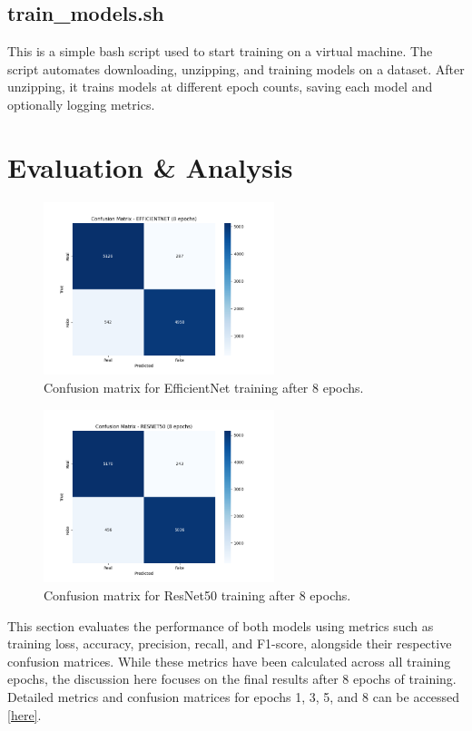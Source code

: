 \documentclass[conference]{IEEEtran}
\begin{document}
    \subsection*{train\_models.sh}
    This is a simple bash script used to start training on a virtual machine. The script automates downloading, unzipping, and training models on a dataset. After unzipping, it trains models at different epoch counts, saving each model and optionally logging metrics.


\section{Evaluation \& Analysis}
\begin{figure}[ht]
\centering
\includegraphics[width=0.6\textwidth]{ef8.png}
\caption{Confusion matrix for EfficientNet training after 8 epochs.}
\label{ef8}
\end{figure} 

\begin{figure}[ht]
\centering
\includegraphics[width=0.6\textwidth]{re8.png}
\caption{Confusion matrix for ResNet50 training after 8 epochs.}
\label{re8}
\end{figure}

This section evaluates the performance of both models using metrics such as training loss, accuracy, precision, recall, and F1-score, alongside their respective confusion matrices. While these metrics have been calculated across all training epochs, the discussion here focuses on the final results after 8 epochs of training. Detailed metrics and confusion matrices for epochs 1, 3, 5, and 8 can be accessed \href{https://github.com/konradwojda/HYU-AI-G08/tree/main/results}{[here]}.  
\end{document}
